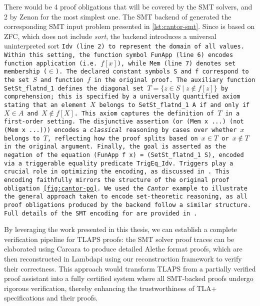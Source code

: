 There would be 4 proof obligations that will be covered by the SMT solvers, and 2 by Zenon for the most simplest one. 
The SMT backend of \tlaplus generated the corresponding SMT input problem presented in \cref{lst:cantor-smt}.
Since \tlaplus is based on ZFC, which does not include \emph{sort}, the backend introduces a universal uninterpreted sort \tt{Idv} (line 2) to represent the domain of all values.
Within this setting, the function symbol \tt{FunApp} (line 6) encodes function application (i.e. $f[x]$), while \tt{Mem} (line 7) denotes set membership ($\in$).
The declared constant symbols \tt{S} and \tt{f} correspond to the set $S$ and function $f$ in the original proof.
The auxiliary function \tt{SetSt\_flatnd\_1} defines the diagonal set $T = \{ z \in S \mid z \notin f[z] \}$ by comprehension; this is specified by a universally quantified axiom stating that an element $X$ belongs to \tt{SetSt\_flatnd\_1 A} if and only if $X \in A$ and $X \notin f[X]$.
This axiom captures the definition of $T$ in a first-order setting.
The disjunctive assertion \tt{(or (Mem x ...) (not (Mem x ...)))} encodes a \emph{classical} reasoning by cases over whether $x$ belongs to $T$, reflecting how the proof splits based on $x \in T$ or $x \notin T$ in the original \tlaplus argument. 
Finally, the goal is asserted as the negation of the equation \tt{(FunApp f x) = (SetSt\_flatnd\_1 S)}, encoded via a triggerable equality predicate \tt{TrigEq\_Idv}.
Triggers play a crucial role in optimizing the encoding, as discussed in \cite[\S3]{new-encoding-tlaps}.
%
This encoding faithfully mirrors the structure of the original \tlaplus proof obligation \cref{fig:cantor-po}.
We used the \textit{Cantor} example to illustrate the general approach taken to encode set-theoretic reasoning, as all proof obligations produced by the backend follow a similar structure.
Full details of the SMT encoding for \tlaplus are provided in \cite{new-encoding-tlaps}.

By leveraging the work presented in this thesis, we can establish a complete verification pipeline for TLAPS proofs: the SMT solver proof traces can be elaborated using Carcara to produce detailed Alethe format proofs, which are then reconstructed in Lambdapi using our reconstruction framework to verify their correctness.
This approach would transform TLAPS from a partially verified proof assistant into a fully certified system where all SMT-backed proofs undergo rigorous verification, thereby enhancing the trustworthiness of TLA+ specifications and their proofs.